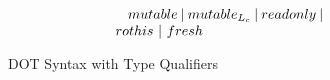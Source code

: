 \begin{figure}[htbp]
\begin{equation*}
\begin{array}{ll|ll}
{{\begin{minipage}{0.43\linewidth}
						$\ \ \ \ mutable\ |\ mutable_{L_c}\ |\ readonly\ |$
						
						$\ \ \ \ rothis\ |\ fresh$
					\end{minipage}
				}
				} \\
	\end{array}
	\end{equation*}
	\caption{DOT Syntax with Type Qualifiers}
	\label{fig-dot-syntax}
\end{figure}

\begin{comment}
\begin{figure}[htbp]
	\begin{equation*}
	\begin{array}{ll|ll}
		x,y,z & \text{Variable} & L::= & \text{Type label} \\
		l & \text{Value label} & \qquad L^c & \quad \text{class label} \\
		m & \text{Method label} & \qquad L^a & \quad \text{abstract type label} \\
		v::= & \text{Value} & S_q,T_q,U_q,V_q,W_q::= & \text{Type} \\
		\qquad x & \qquad \text{variable} & \qquad p.L & \quad \text{type selection} \\
		t::= & \text{Term} & \qquad T_q\ \{ z \Rightarrow \overline{D} \} & \quad \text{type refinement} \\
		\qquad v & \qquad \text{value} & \qquad T_q \land T_q & \quad \text{intersection type} \\
		\qquad {\bf val}\ x = {\bf new}\ c; t & \qquad \text{new instance} & \qquad T_q \lor T_q & \quad \text{union type} \\
		\qquad t.l & \qquad \text{field selection} & \qquad \top & \quad \text{top type} \\
		\qquad t.m(t) & \qquad \text{method invocation} & \qquad \bot & \quad \text{bottom type} \\
		p::= & \text{Path} & S_q^c, T_q^c ::= & \text{Concrete type} \\
		\qquad x & \qquad \text{variable} &
			\multicolumn{2}{l}{
			\qquad p.L^c\ |\ T_q^c\ \{ z \Rightarrow \overline{D} \}\ |\ T_q^c \land T_q^c\ |\ \top} \\
		\qquad p.l & \qquad \text{selection} & D::= & \text{Declaration} \\
		c::=T_q^c\ \{\overline{d}\} & \text{Constructor} & \qquad L:S_q..U_q & \quad \text{type declaration} \\
		d::= & \text{Initialization} & \qquad l:T_q & \quad \text{value declaration} \\

\end{comment}
